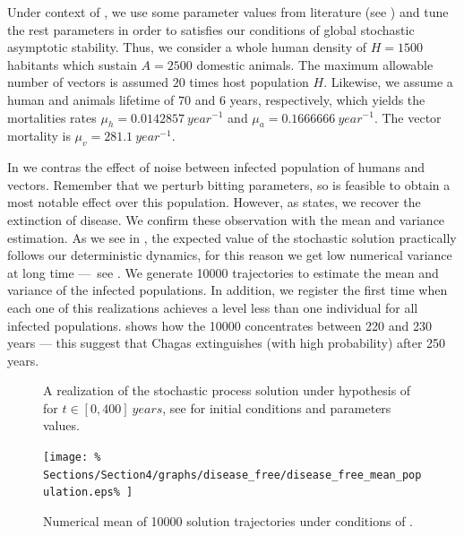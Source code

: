 	Under context of , we use some parameter values from 
literature (see ) and tune the rest
parameters in order to satisfies our conditions of global stochastic asymptotic
stability. Thus, we consider a whole human density of $H=\num{1500}$ habitants
which sustain $A=\num{2500}$ domestic animals. The maximum allowable number of 
vectors is assumed $20$ times host population $H$.  Likewise, we assume a
human and animals lifetime of $70$ and $6$ years, respectively, which yields
the mortalities rates 
$\mu_{h} = \num{0.0142857}\ \si{year^{-1}}$ and 
$\mu_{a} = \num{0.1666666}\ \si{year^{-1}}$. 
The vector mortality is $\mu_{v}= \num{281.1}~\si{year^{-1}}$.

	In  we contras the effect of noise
between infected population of humans and vectors. Remember that we perturb
bitting parameters, so is feasible to obtain a most notable effect over this
population. However, as  states, we recover the extinction of
disease. We confirm these observation with the mean and variance estimation. As
we see in , the expected value of the stochastic
solution practically follows our deterministic dynamics, for this reason we get
low numerical variance at long time ---~see .
We generate \num{10 000} trajectories to estimate the mean and variance
of the infected populations. In addition, we register the first time when each 
one of this realizations achieves a level less than one individual for all 
infected populations.  shows how
the \num{10 000} concentrates between \num{220} and \num{230} \si{years} --- 
this suggest that Chagas extinguishes (with high probability) after \num{250}
years.
%

%
\begin{figure}[p]
	\centering
	\caption{
		A realization of the stochastic process solution under hypothesis of
		 for $t\in[0,400]~\si{years}$, see
		for initial conditions and parameters values.
	}
	\label{fig:trajectories_free_desease}
\end{figure}
%
%
\begin{figure}[p]
	\centering
	\texttt{[image: \%
		Sections/Section4/graphs/disease\_free/disease\_free\_mean\_population.eps\%
		]}%
	\caption{
		Numerical mean of \num{10000} solution trajectories
		under conditions of .
	}
	\label{fig:mean_free_disease}
\end{figure}

